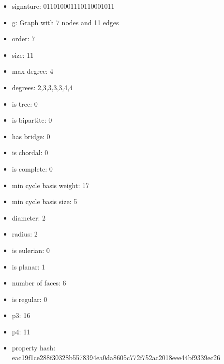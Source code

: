\begin{itemize}
\item signature: 011010001110110001011
\item g: Graph with 7 nodes and 11 edges
\item order: 7
\item size: 11
\item max degree: 4
\item degrees: 2,3,3,3,3,4,4
\item is tree: 0
\item is bipartite: 0
\item has bridge: 0
\item is chordal: 0
\item is complete: 0
\item min cycle basis weight: 17
\item min cycle basis size: 5
\item diameter: 2
\item radius: 2
\item is eulerian: 0
\item is planar: 1
\item number of faces: 6
\item is regular: 0
\item p3: 16
\item p4: 11
\item property hash: eac19f1ce288f30328b5578394ea0da8605c772f752ac2018eee44bf9339ec26
\end{itemize}
\newpage
\begin{figure}
\end{figure}
